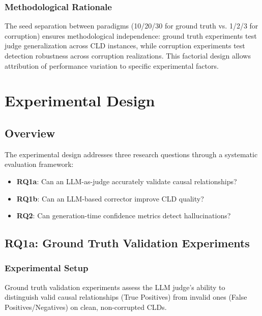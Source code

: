 \documentclass{article}
\begin{document}
\subsubsection{Methodological Rationale}

The seed separation between paradigms (10/20/30 for ground truth vs. 1/2/3 for corruption) ensures methodological independence: ground truth experiments test judge generalization across CLD instances, while corruption experiments test detection robustness across corruption realizations. This factorial design allows attribution of performance variation to specific experimental factors.

\section{Experimental Design}

\subsection{Overview}

The experimental design addresses three research questions through a systematic evaluation framework:

\begin{itemize}
    \item \textbf{RQ1a}: Can an LLM-as-judge accurately validate causal relationships?
    \item \textbf{RQ1b}: Can an LLM-based corrector improve CLD quality?
    \item \textbf{RQ2}: Can generation-time confidence metrics detect hallucinations?
\end{itemize}

\subsection{RQ1a: Ground Truth Validation Experiments}

\subsubsection{Experimental Setup}

Ground truth validation experiments assess the LLM judge's ability to distinguish valid causal relationships (True Positives) from invalid ones (False Positives/Negatives) on clean, non-corrupted CLDs.
\end{document}
